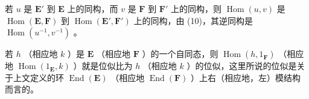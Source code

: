 若 \(u\) 是 \(\mathbf{E}'\) 到 \(\mathbf{E}\) 上的同构，而 \(v\) 是 \(\mathbf{F}\) 到 \(\mathbf{F}'\) 上的同构，则 \(\operatorname{Hom}(u, v)\) 是 \(\operatorname{Hom}(\mathbf{E}, \mathbf{F})\) 到 \(\operatorname{Hom}(\mathbf{E}', \mathbf{F}')\) 上的同构，由 (10)，其逆同构是 \(\operatorname{Hom}(u^{-1}, v^{-1})\) 。

若 \(h\) （相应地 \(k\) ）是 \(\mathbf{E}\) （相应地 \(\mathbf{F}\) ）的一个自同态，则 \(\operatorname{Hom}(h, 1_{\mathbf{F}})\) （相应地 \(\operatorname{Hom}(1_{\mathbf{E}}, k)\) ）就是位似比为 \(h\) （相应地 \(k\) ）的位似，这里所说的位似是关于上文定义的环 \(\operatorname{End}(\mathbf{E})\) （相应地 \(\operatorname{End}(\mathbf{F})\) ）上右（相应地，左）模结构而言的。

